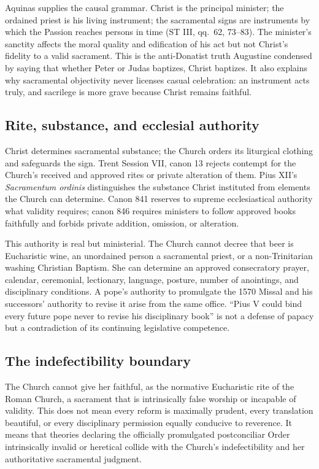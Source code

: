 Aquinas supplies the causal grammar. Christ is the principal minister; the ordained priest is his living instrument; the sacramental signs are instruments by which the Passion reaches persons in time (ST III, qq.~62, 73--83). The minister's sanctity affects the moral quality and edification of his act but not Christ's fidelity to a valid sacrament. This is the anti-Donatist truth Augustine condensed by saying that whether Peter or Judas baptizes, Christ baptizes. It also explains why sacramental objectivity never licenses casual celebration: an instrument acts truly, and sacrilege is more grave because Christ remains faithful.

\subsection{Rite, substance, and ecclesial authority}

Christ determines sacramental substance; the Church orders its liturgical clothing and safeguards the sign. Trent Session VII, canon 13 rejects contempt for the Church's received and approved rites or private alteration of them. Pius XII's \emph{Sacramentum ordinis} distinguishes the substance Christ instituted from elements the Church can determine. Canon 841 reserves to supreme ecclesiastical authority what validity requires; canon 846 requires ministers to follow approved books faithfully and forbids private addition, omission, or alteration.

This authority is real but ministerial. The Church cannot decree that beer is Eucharistic wine, an unordained person a sacramental priest, or a non-Trinitarian washing Christian Baptism. She can determine an approved consecratory prayer, calendar, ceremonial, lectionary, language, posture, number of anointings, and disciplinary conditions. A pope's authority to promulgate the 1570 Missal and his successors' authority to revise it arise from the same office. “Pius V could bind every future pope never to revise his disciplinary book” is not a defense of papacy but a contradiction of its continuing legislative competence.

\subsection{The indefectibility boundary}

The Church cannot give her faithful, as the normative Eucharistic rite of the Roman Church, a sacrament that is intrinsically false worship or incapable of validity. This does not mean every reform is maximally prudent, every translation beautiful, or every disciplinary permission equally conducive to reverence. It means that theories declaring the officially promulgated postconciliar Order intrinsically invalid or heretical collide with the Church's indefectibility and her authoritative sacramental judgment.

